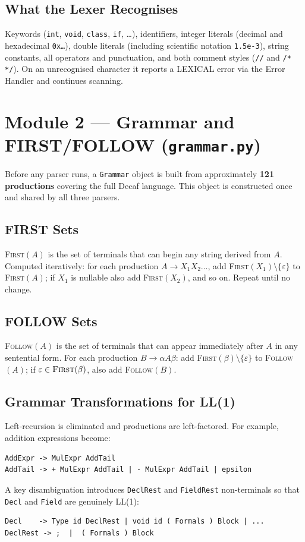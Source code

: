 \documentclass[12pt,a4paper]{article}
\begin{document}
\subsection*{What the Lexer Recognises}
Keywords (\texttt{int}, \texttt{void}, \texttt{class}, \texttt{if}, \ldots),
identifiers, integer literals (decimal and hexadecimal \texttt{0x\ldots}),
double literals (including scientific notation \texttt{1.5e-3}), string constants,
all operators and punctuation, and both comment styles (\texttt{//} and
\texttt{/* */}). On an unrecognised character it reports a LEXICAL error via the
Error Handler and continues scanning.

\section{Module 2 — Grammar and FIRST/FOLLOW (\texttt{grammar.py})}

Before any parser runs, a \texttt{Grammar} object is built from approximately
\textbf{121 productions} covering the full Decaf language. This object is
constructed once and shared by all three parsers.

\subsection*{FIRST Sets}
\textsc{First}$(A)$ is the set of terminals that can begin any string derived from
$A$. Computed iteratively: for each production $A \to X_1 X_2 \ldots$,
add \textsc{First}$(X_1) \setminus \{\varepsilon\}$ to \textsc{First}$(A)$; if
$X_1$ is nullable also add \textsc{First}$(X_2)$, and so on. Repeat until no
change.

\subsection*{FOLLOW Sets}
\textsc{Follow}$(A)$ is the set of terminals that can appear immediately after $A$
in any sentential form. For each production $B \to \alpha A \beta$:
add \textsc{First}$(\beta) \setminus \{\varepsilon\}$ to \textsc{Follow}$(A)$;
if $\varepsilon \in \textsc{First}(\beta)$, also add \textsc{Follow}$(B)$.

\subsection*{Grammar Transformations for LL(1)}
Left-recursion is eliminated and productions are left-factored. For example,
addition expressions become:
\begin{lstlisting}
AddExpr -> MulExpr AddTail
AddTail -> + MulExpr AddTail | - MulExpr AddTail | epsilon
\end{lstlisting}
A key disambiguation introduces \texttt{DeclRest} and \texttt{FieldRest}
non-terminals so that \texttt{Decl} and \texttt{Field} are genuinely LL(1):
\begin{lstlisting}
Decl    -> Type id DeclRest | void id ( Formals ) Block | ...
DeclRest -> ;  |  ( Formals ) Block
\end{lstlisting}
\end{document}
